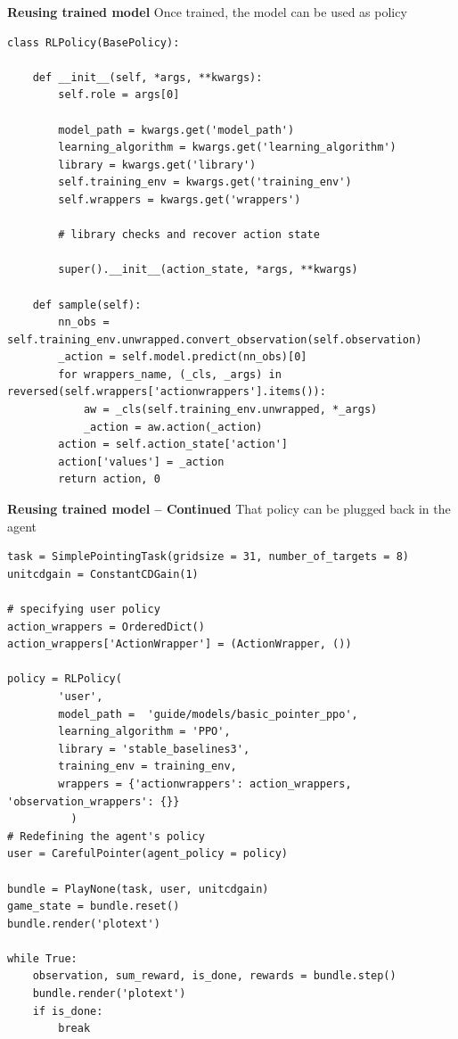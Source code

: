 \documentclass[11pt, xcolor = {dvipsnames}]{beamer}
\begin{document}
\begin{frame}[fragile]{\textbf{Reusing trained model}}
Once trained, the model can be used as policy
\begin{adjustbox}{width=\textwidth}
\lstset{language=Python}
\lstset{frame=lines}
\lstset{basicstyle=\footnotesize}
\begin{lstlisting}
class RLPolicy(BasePolicy):
   
    def __init__(self, *args, **kwargs):
        self.role = args[0]
        
        model_path = kwargs.get('model_path')
        learning_algorithm = kwargs.get('learning_algorithm')
        library = kwargs.get('library')
        self.training_env = kwargs.get('training_env')
        self.wrappers = kwargs.get('wrappers')
        
        # library checks and recover action state

        super().__init__(action_state, *args, **kwargs)

    def sample(self):
        nn_obs = self.training_env.unwrapped.convert_observation(self.observation)
        _action = self.model.predict(nn_obs)[0]
        for wrappers_name, (_cls, _args) in reversed(self.wrappers['actionwrappers'].items()):
            aw = _cls(self.training_env.unwrapped, *_args)
            _action = aw.action(_action)
        action = self.action_state['action']
        action['values'] = _action
        return action, 0
\end{lstlisting}
\end{adjustbox}
\end{frame}

\begin{frame}[fragile]{\textbf{Reusing trained model -- Continued}}
That policy can be plugged back in the agent
\begin{adjustbox}{width=.95\textwidth}
\lstset{language=Python}
\lstset{frame=lines}
\lstset{basicstyle=\footnotesize}
\begin{lstlisting}
task = SimplePointingTask(gridsize = 31, number_of_targets = 8)
unitcdgain = ConstantCDGain(1)

# specifying user policy
action_wrappers = OrderedDict()
action_wrappers['ActionWrapper'] = (ActionWrapper, ())

policy = RLPolicy(
        'user',
        model_path =  'guide/models/basic_pointer_ppo',
        learning_algorithm = 'PPO',
        library = 'stable_baselines3',
        training_env = training_env,
        wrappers = {'actionwrappers': action_wrappers, 'observation_wrappers': {}}
          )
# Redefining the agent's policy 
user = CarefulPointer(agent_policy = policy)

bundle = PlayNone(task, user, unitcdgain)
game_state = bundle.reset()
bundle.render('plotext')

while True:
    observation, sum_reward, is_done, rewards = bundle.step()
    bundle.render('plotext')
    if is_done:
        break
\end{lstlisting}
\end{adjustbox}
\end{frame}
\end{document}
